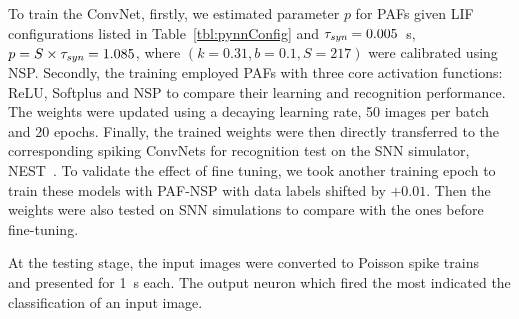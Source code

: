 	To train the ConvNet, firstly, we estimated parameter $p$ for PAFs given LIF configurations listed in Table~\ref{tbl:pynnConfig} and $\tau_{\textit{\textrm{syn}}}=0.005$~s, $p = S \times \tau_{\textit{\textrm{syn}}} = 1.085$, where $(k=0.31, b=0.1, S=217)$ were calibrated using NSP. 
	Secondly, the training employed PAFs with three core activation functions: ReLU, Softplus and NSP to compare their learning and recognition performance.
	The weights were updated using a decaying learning rate, 50 images per batch and 20 epochs.
	Finally, the trained weights were then directly transferred to the corresponding spiking ConvNets for recognition test on the SNN simulator, NEST~\citep{gewaltig2007nest}.
	To validate the effect of fine tuning, we took another training epoch to train these models with PAF-NSP with data labels shifted by $+0.01$.
	Then the weights were also tested on SNN simulations to compare with the ones before fine-tuning.
	
	At the testing stage, the input images were converted to Poisson spike trains~\citep{liu2016bench} and presented for 1~s each.
	The output neuron which fired the most indicated the classification of an input image.
%	
%	
	

